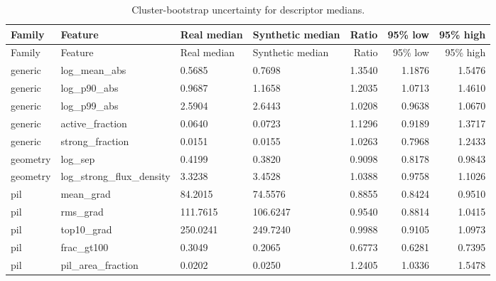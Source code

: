 \scriptsize
\begin{longtable}{llllrrr}
\caption{Cluster-bootstrap uncertainty for descriptor medians.}\label{tab:bootstrap}\\
\toprule
Family & Feature & Real median & Synthetic median & Ratio & 95\% low & 95\% high\\
\midrule
\endfirsthead
\toprule
Family & Feature & Real median & Synthetic median & Ratio & 95\% low & 95\% high\\
\midrule
\endhead
generic & log\_mean\_abs & 0.5685 & 0.7698 & 1.3540 & 1.1876 & 1.5476\\
generic & log\_p90\_abs & 0.9687 & 1.1658 & 1.2035 & 1.0713 & 1.4610\\
generic & log\_p99\_abs & 2.5904 & 2.6443 & 1.0208 & 0.9638 & 1.0670\\
generic & active\_fraction & 0.0640 & 0.0723 & 1.1296 & 0.9189 & 1.3717\\
generic & strong\_fraction & 0.0151 & 0.0155 & 1.0263 & 0.7968 & 1.2433\\
geometry & log\_sep & 0.4199 & 0.3820 & 0.9098 & 0.8178 & 0.9843\\
geometry & log\_strong\_flux\_density & 3.3238 & 3.4528 & 1.0388 & 0.9758 & 1.1026\\
pil & mean\_grad & 84.2015 & 74.5576 & 0.8855 & 0.8424 & 0.9510\\
pil & rms\_grad & 111.7615 & 106.6247 & 0.9540 & 0.8814 & 1.0415\\
pil & top10\_grad & 250.0241 & 249.7240 & 0.9988 & 0.9105 & 1.0973\\
pil & frac\_gt100 & 0.3049 & 0.2065 & 0.6773 & 0.6281 & 0.7395\\
pil & pil\_area\_fraction & 0.0202 & 0.0250 & 1.2405 & 1.0336 & 1.5478\\
\bottomrule
\end{longtable}
\normalsize
